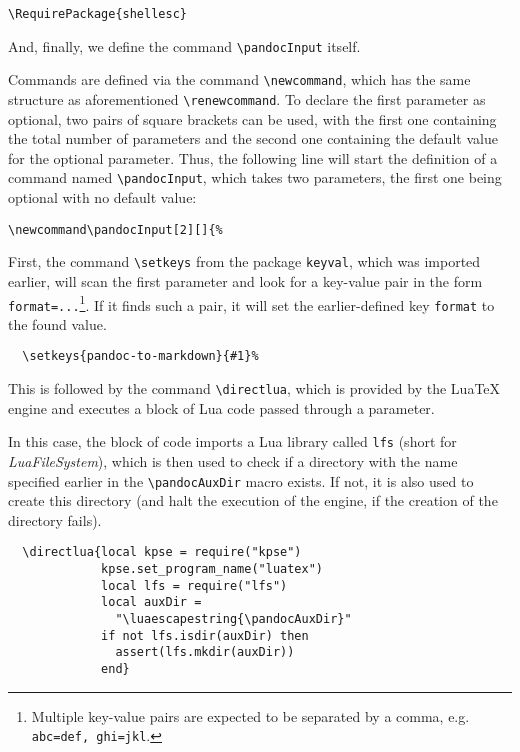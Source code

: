 \documentclass[
  digital,     %
  oneside,     %
  nosansbold,  %
  nocolorbold, %
  lof,         %
  nolot,       %
]{fithesis4}
\newcommand\macro[1]{\texttt{\textbackslash{}{#1}}}
\begin{document}
\noindent
\lstset{language=[LaTeX]TeX}
\begin{lstlisting}
\RequirePackage{shellesc}
\end{lstlisting}

\noindent
And, finally, we define the command \macro{pandocInput} itself.

Commands are defined via the command \macro{newcommand}, which has the same structure as aforementioned \macro{renewcommand}. To declare the first parameter as optional, two pairs of square brackets can be used, with the first one containing the total number of parameters and the second one containing the default value for the optional parameter. Thus, the following line will start the definition of a command named \macro{pandocInput}, which takes two parameters, the first one being optional with no default value:

\noindent
\lstset{language=[LaTeX]TeX}
\begin{lstlisting}
\newcommand\pandocInput[2][]{%
\end{lstlisting}

\noindent
First, the command \macro{setkeys} from the package \texttt{keyval}, which was imported earlier, will scan the first parameter and look for a key-value pair in the form \texttt{format=...}\footnote{Multiple key-value pairs are expected to be separated by a comma, e.g. \texttt{abc=def,~ghi=jkl}.}. If it finds such a pair, it will set the earlier-defined key \texttt{format} to the found value.

\noindent
\lstset{language=[LaTeX]TeX}
\begin{lstlisting}
  \setkeys{pandoc-to-markdown}{#1}%
\end{lstlisting}

\noindent
This is followed by the command \macro{directlua}, which is provided by the Lua\TeX{} engine and executes a block of Lua code passed through a parameter.

In this case, the block of code imports a Lua library called \texttt{lfs} (short for \emph{LuaFileSystem}), which is then used to check if a directory with the name specified earlier in the \macro{pandocAuxDir} macro exists. If not, it is also used to create this directory (and halt the execution of the engine, if the creation of the directory fails).

\noindent
\lstset{language=[LaTeX]TeX}
\begin{lstlisting}
  \directlua{local kpse = require("kpse")
             kpse.set_program_name("luatex")
             local lfs = require("lfs")
             local auxDir =
               "\luaescapestring{\pandocAuxDir}"
             if not lfs.isdir(auxDir) then
               assert(lfs.mkdir(auxDir))
             end}
\end{lstlisting}
\end{document}
